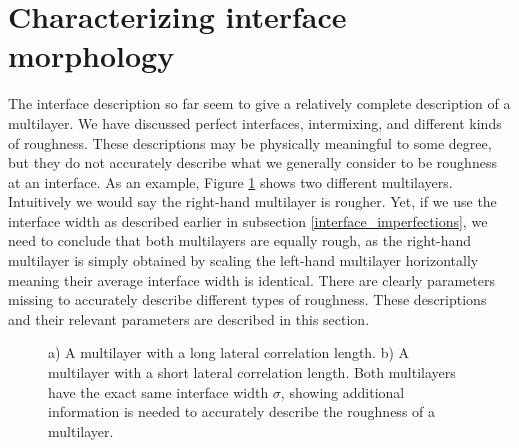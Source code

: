 \section{Characterizing interface morphology}
The interface description so far seem to give a relatively complete description of a multilayer. We have discussed perfect interfaces, intermixing, and different kinds of roughness. These descriptions may be physically meaningful to some degree, but they do not accurately describe what we generally consider to be roughness at an interface. As an example, Figure \ref{same_roughness} shows two different multilayers. Intuitively we would say the right-hand multilayer is rougher. Yet, if we use the interface width as described earlier in subsection \ref{interface_imperfections}, we need to conclude that both multilayers are equally rough, as the right-hand multilayer is simply obtained by scaling the left-hand multilayer horizontally meaning their average interface width is identical. There are clearly parameters missing to accurately describe different types of roughness. These descriptions and their relevant parameters are described in this section.
\begin{figure}
	\centering
	\def\svgwidth{\textwidth}
	
	\caption{a) A multilayer with a long lateral correlation length. b) A multilayer with a short lateral correlation length. Both multilayers have the exact same interface width $\sigma$, showing additional information is needed to accurately describe the roughness of a multilayer.}
	\label{same_roughness}
\end{figure}
